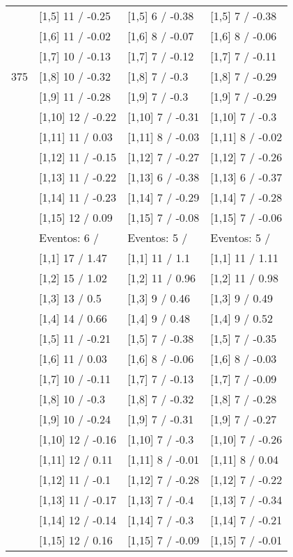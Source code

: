 \begin{table}
\begin{tabular}[t]{llll}
 & {}[1,5] 11  / -0.25 & {}[1,5] 6  / -0.38 & {}[1,5] 7  / -0.38\\
 & {}[1,6] 11  / -0.02 & {}[1,6] 8  / -0.07 & {}[1,6] 8  / -0.06\\
 & {}[1,7] 10  / -0.13 & {}[1,7] 7  / -0.12 & {}[1,7] 7  / -0.11\\
375 & {}[1,8] 10  / -0.32 & {}[1,8] 7  / -0.3 & {}[1,8] 7  / -0.29\\
\addlinespace
 & {}[1,9] 11  / -0.28 & {}[1,9] 7  / -0.3 & {}[1,9] 7  / -0.29\\
 & {}[1,10] 12  / -0.22 & {}[1,10] 7  / -0.31 & {}[1,10] 7  / -0.3\\
 & {}[1,11] 11  / 0.03 & {}[1,11] 8  / -0.03 & {}[1,11] 8  / -0.02\\
 & {}[1,12] 11  / -0.15 & {}[1,12] 7  / -0.27 & {}[1,12] 7  / -0.26\\
 & {}[1,13] 11  / -0.22 & {}[1,13] 6  / -0.38 & {}[1,13] 6  / -0.37\\
\addlinespace
 & {}[1,14] 11  / -0.23 & {}[1,14] 7  / -0.29 & {}[1,14] 7  / -0.28\\
 & {}[1,15] 12  / 0.09 & {}[1,15] 7  / -0.08 & {}[1,15] 7  / -0.06\\
 & Eventos:  6 / & Eventos:  5 / & Eventos:  5 /\\
 & {}[1,1] 17  / 1.47 & {}[1,1] 11  / 1.1 & {}[1,1] 11  / 1.11\\
 & {}[1,2] 15  / 1.02 & {}[1,2] 11  / 0.96 & {}[1,2] 11  / 0.98\\
\addlinespace
 & {}[1,3] 13  / 0.5 & {}[1,3] 9  / 0.46 & {}[1,3] 9  / 0.49\\
 & {}[1,4] 14  / 0.66 & {}[1,4] 9  / 0.48 & {}[1,4] 9  / 0.52\\
 & {}[1,5] 11  / -0.21 & {}[1,5] 7  / -0.38 & {}[1,5] 7  / -0.35\\
 & {}[1,6] 11  / 0.03 & {}[1,6] 8  / -0.06 & {}[1,6] 8  / -0.03\\
 & {}[1,7] 10  / -0.11 & {}[1,7] 7  / -0.13 & {}[1,7] 7  / -0.09\\
\addlinespace
500 & {}[1,8] 10  / -0.3 & {}[1,8] 7  / -0.32 & {}[1,8] 7  / -0.28\\
 & {}[1,9] 10  / -0.24 & {}[1,9] 7  / -0.31 & {}[1,9] 7  / -0.27\\
 & {}[1,10] 12  / -0.16 & {}[1,10] 7  / -0.3 & {}[1,10] 7  / -0.26\\
 & {}[1,11] 12  / 0.11 & {}[1,11] 8  / -0.01 & {}[1,11] 8  / 0.04\\
 & {}[1,12] 11  / -0.1 & {}[1,12] 7  / -0.28 & {}[1,12] 7  / -0.22\\
\addlinespace
 & {}[1,13] 11  / -0.17 & {}[1,13] 7  / -0.4 & {}[1,13] 7  / -0.34\\
 & {}[1,14] 12  / -0.14 & {}[1,14] 7  / -0.3 & {}[1,14] 7  / -0.21\\
 & {}[1,15] 12  / 0.16 & {}[1,15] 7  / -0.09 & {}[1,15] 7  / -0.01\\
\bottomrule
\end{tabular}
\end{table}
